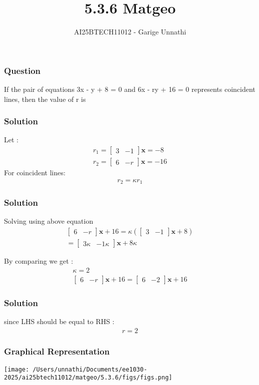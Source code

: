 \documentclass{beamer}
\title{5.3.6 Matgeo}
\author{AI25BTECH11012 - Garige Unnathi}
\date{}
\begin{document}
\frame{\titlepage}

\begin{frame}
\frametitle{Question}
If the pair of equations 3x - y + 8 = 0 and 6x - ry + 16 = 0 represents coincident
lines, then the value of r is 
\end{frame}


\begin{frame}
\frametitle{Solution}
Let :
\begin{align}
    \textbf{$r_1$} = \begin{bmatrix}3 & -1\end{bmatrix}\textbf{x} = -8 \\
    \textbf{$r_2$} = \begin{bmatrix}6 & -r\end{bmatrix}\textbf{x} = -16
\end{align}
For coincident lines:
\begin{align}
    \textbf{$r_2$} = \kappa  \textbf{$r_1$}
\end{align}
\end{frame}

\begin{frame}
\frametitle{Solution}
Solving using above equation 
\begin{align}
    \begin{bmatrix}6 & -r\end{bmatrix}\textbf{x} + 16 = \kappa(\begin{bmatrix}3 & -1\end{bmatrix}\textbf{x} + 8)\\
     = \begin{bmatrix}3\kappa & -1\kappa\end{bmatrix}\textbf{x} + 8\kappa
\end{align}

By comparing we get :
\begin{align}
    \kappa = 2\\
     \begin{bmatrix}6 & -r\end{bmatrix}\textbf{x} + 16 = \begin{bmatrix}6 & -2 \end{bmatrix}\textbf{x} + 16
\end{align}
\end{frame}


\begin{frame}
\frametitle{Solution}
since LHS should be equal to RHS :
\begin{align}
    r = 2
\end{align}
\end{frame}


\begin{frame}

\frametitle{Graphical Representation}
\begin{center}
\texttt{[image: /Users/unnathi/Documents/ee1030-2025/ai25btech11012/matgeo/5.3.6/figs/figs.png]}
\end{center}
\end{frame}
\end{document}

